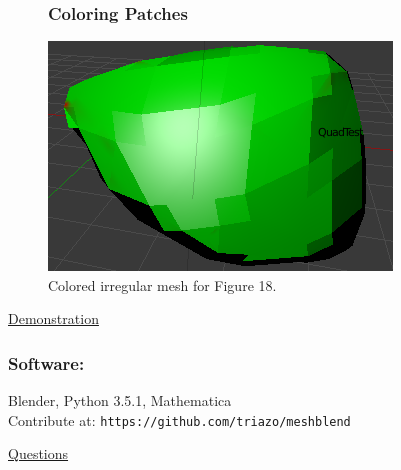 \documentclass[11pt]{beamer}
\begin{document}
		
	\pagebreak
		
	\begin{frame}
		\begin{figure}[h]
			\frametitle{Coloring Patches}
			\centering
			\includegraphics[width=.43\linewidth]{img/ir_2_color}
			\caption{Colored irregular mesh for Figure 18.}
		\end{figure}
	\end{frame}	

	
	\begin{frame}
		\centering
		\underline{{\huge Demonstration}}
	\end{frame}
	

	\begin{frame} 
		\frametitle{Software:}
		Blender, Python 3.5.1, Mathematica\\
		\vspace{0.50in}
		Contribute at: \texttt{https://github.com/triazo/meshblend}
	\end{frame}

	\begin{frame}
		\centering
		\underline{{\huge Questions}}
	\end{frame}
	
\end{document}
